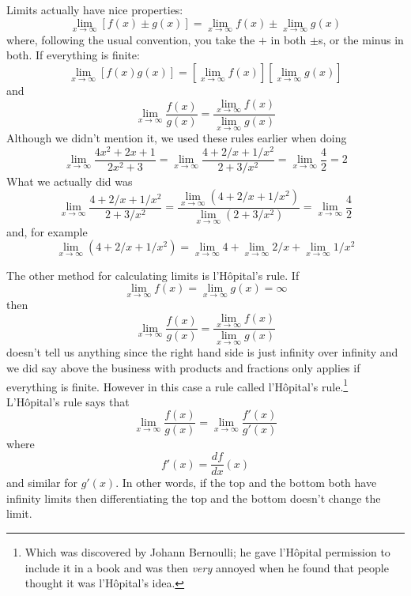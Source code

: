 \documentclass[11pt,a4paper]{scrartcl}
\begin{document}
Limits actually have nice properties:
\begin{equation}
\lim_{x\rightarrow \infty}[f(x)\pm g(x)]=\lim_{x\rightarrow \infty}f(x)\pm \lim_{x\rightarrow \infty}g(x)
\end{equation}
where, following the usual convention, you take the $+$ in both
$\pm$s, or the minus in both. If everything is finite:
\begin{equation}
\lim_{x\rightarrow \infty}[f(x)g(x)]=\left[\lim_{x\rightarrow \infty}f(x)\right]\left[\lim_{x\rightarrow \infty}g(x)\right]
\end{equation}
and
\begin{equation}
\lim_{x\rightarrow \infty}\frac{f(x)}{g(x)}=\frac{\lim_{x\rightarrow \infty}f(x)}{\lim_{x\rightarrow \infty}g(x)}
\end{equation}
Although we didn't mention it, we used these rules earlier when doing
\begin{equation}
\lim_{x\rightarrow \infty}\frac{4x^2+2x+1}{2x^2+3}=
\lim_{x\rightarrow \infty}\frac{4+2/x+1/x^2}{2+3/x^2}=
\lim_{x\rightarrow \infty}\frac{4}{2}=2
\end{equation}
What we actually did was 
\begin{equation}
\lim_{x\rightarrow \infty}\frac{4+2/x+1/x^2}{2+3/x^2}=
\frac{\lim_{x\rightarrow \infty}(4+2/x+1/x^2)}{\lim_{x\rightarrow \infty}(2+3/x^2)}=
\lim_{x\rightarrow \infty}\frac{4}{2}
\end{equation}
and, for example
\begin{equation}
\lim_{x\rightarrow \infty} (4+2/x+1/x^2)=\lim_{x\rightarrow \infty} 4+\lim_{x\rightarrow \infty}2/x+\lim_{x\rightarrow \infty}1/x^2
\end{equation}

The other method for calculating limits is l'H\^{o}pital's rule. If 
\begin{equation}
\lim_{x\rightarrow \infty}f(x)=\lim_{x\rightarrow \infty}g(x)=\infty
\end{equation}
then
\begin{equation}
\lim_{x\rightarrow \infty}\frac{f(x)}{g(x)}=\frac{\lim_{x\rightarrow \infty} f(x)}{\lim_{x\rightarrow \infty} g(x)}
\end{equation}
doesn't tell us anything since the right hand side is just infinity
over infinity and we did say above the business with products and
fractions only applies if everything is finite. However in this case a
rule called l'H\^{o}pital's rule.\footnote{Which was discovered by
  Johann Bernoulli; he gave l'H\^{o}pital permission to include it in
  a book and was then \textsl{very} annoyed when he found that people
  thought it was l'H\^{o}pital's idea.} L'H\^{o}pital's rule says that
\begin{equation}
\lim_{x\rightarrow \infty}\frac{f(x)}{g(x)}=\lim_{x\rightarrow \infty}\frac{f'(x)}{g'(x)}
\end{equation}
where 
\begin{equation}
f'(x)=\frac{df}{dx}(x)
\end{equation}
and similar for $g'(x)$. In other words, if the top and the bottom
both have infinity limits then differentiating the top and the bottom
doesn't change the limit. 
\end{document}
